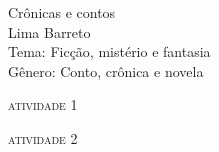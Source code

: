 \documentclass[smaller,professionalfonts,15pt]{beamer}
\begin{document}
										\begin{frame}\begin{raggedleft}
										\Huge 
Crônicas e contos						\\
										\huge 
Lima Barreto							\\
										\bigskip
										\normalsize
Tema: Ficção, mistério e fantasia		\\	
Gênero: Conto, crônica e novela			\\\vfill\hfill
\publishername
										\end{raggedleft}

\end{frame}


\begin{frame}
\begin{figure}
\hfill{}
\end{figure}
\end{frame}


\begin{frame}
\hfill\Huge
\textsc{atividade 1}
\end{frame}


\begin{frame}
\hfill\Huge
\textsc{atividade 2}
\end{frame}
\end{document}
